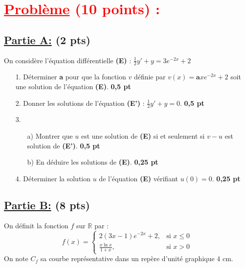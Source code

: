 \documentclass[12pt]{article}
\begin{document}
\section*{\textcolor{red}{\underline{Problème} (10 points) :}}
\subsection*{\underline{Partie A:} (2 pts)}
On considère l'équation différentielle \textbf{(E)} : $\frac{1}{2}y' + y = 3e^{-2x} + 2$

\begin{itemize}
    \item[1.] Déterminer \textbf{a} pour que la fonction $v$ définie par $v(x) = \textbf{a}xe^{-2x} + 2$ soit une solution de l'équation \textbf{(E)}. \textbf{0,5 pt}
    \item[2.] Donner les solutions de l'équation \textbf{(E')} : $\frac{1}{2}y' + y = 0$. \textbf{0,5 pt}
    \item[3.] 
    \begin{itemize}
        \item[a)] Montrer que $u$ est une solution de \textbf{(E)} si et seulement si $v - u$ est solution de \textbf{(E')}. \textbf{0,5 pt}
        \item[b)] En déduire les solutions de \textbf{(E)}. \textbf{0,25 pt}
    \end{itemize}
    \item[4.] Déterminer la solution $u$ de l'équation \textbf{(E)} vérifiant $u(0) = 0$. \textbf{0,25 pt}
\end{itemize}
\subsection*{\underline{Partie B:} (8 pts)}
On définit la fonction $f$ sur $\mathbb{R}$ par :
\[
f(x) = \begin{cases} 
  2(3x - 1)e^{-2x} + 2, & \text{si } x \leq 0 \\
  \frac{x\ln x}{1 + x}, & \text{si } x > 0 
\end{cases}
\]
On note $C_{f}$ sa courbe représentative dans un repère d'unité graphique 4 cm.
\end{document}
